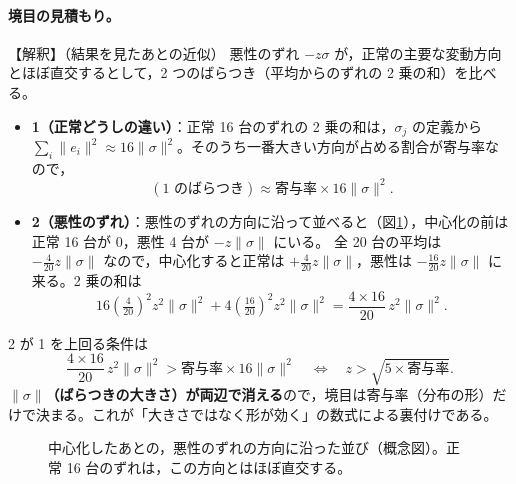\documentclass[a4j, dvipdfmx]{jsarticle}  %
\begin{document}
\paragraph{境目の見積もり。}【解釈】（結果を見たあとの近似）
悪性のずれ $-z\sigma$ が，正常の主要な変動方向とほぼ直交するとして，2 つのばらつき（平均からのずれの 2 乗の和）を比べる。
\begin{itemize}
  \item \textbf{1（正常どうしの違い）}：正常 16 台のずれの 2 乗の和は，$\sigma_j$ の定義から $\sum_i \|e_i\|^2 \approx 16\|\sigma\|^2$。そのうち一番大きい方向が占める割合が寄与率なので，
        \begin{equation}
          (\text{1 のばらつき}) \approx \text{寄与率} \times 16\|\sigma\|^2 .
        \end{equation}
  \item \textbf{2（悪性のずれ）}：悪性のずれの方向に沿って並べると（図\ref{fig:noniid-est}），中心化の前は正常 16 台が 0，悪性 4 台が $-z\|\sigma\|$ にいる。
        全 20 台の平均は $-\frac{4}{20} z\|\sigma\|$ なので，中心化すると正常は $+\frac{4}{20} z\|\sigma\|$，悪性は $-\frac{16}{20} z\|\sigma\|$ に来る。2 乗の和は
        \begin{equation}
          16 \left(\tfrac{4}{20}\right)^2 z^2\|\sigma\|^2 + 4 \left(\tfrac{16}{20}\right)^2 z^2\|\sigma\|^2 = \frac{4 \times 16}{20}\, z^2 \|\sigma\|^2 .
        \end{equation}
\end{itemize}
2 が 1 を上回る条件は
\begin{equation}
  \frac{4 \times 16}{20}\, z^2 \|\sigma\|^2 > \text{寄与率} \times 16\|\sigma\|^2
  \quad\Longleftrightarrow\quad
  z > \sqrt{5 \times \text{寄与率}} .
\end{equation}
\textbf{$\|\sigma\|$（ばらつきの大きさ）が両辺で消える}ので，境目は寄与率（分布の形）だけで決まる。これが「大きさではなく形が効く」の数式による裏付けである。

\begin{figure}[H]
\centering
{}
\caption{中心化したあとの，悪性のずれの方向に沿った並び（概念図）。正常 16 台のずれは，この方向とはほぼ直交する。}
\label{fig:noniid-est}
\end{figure}
\end{document}

